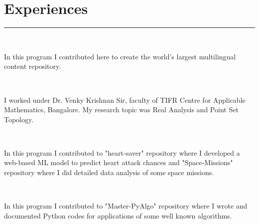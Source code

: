\documentclass[]{debjitpal-resume}
\begin{document}
\begin{minipage}[t]{0.6\textwidth}
\section{Experiences}
\noindent\rule{12.5cm}{0.4pt}
 \\
\noindent
\hspace{4em}%
\begin{minipage}{0.85\textwidth\vspace{2pt}}
In this program I contributed here to create the world's largest multilingual content repository.\\
\end{minipage}
\sectionsep
{} \\
\noindent
\hspace{4em}%
\begin{minipage}{0.85\textwidth\vspace{2pt}}
I worked under Dr. Venky Krishnan Sir, faculty of TIFR Centre for Applicable Mathematics, Bangalore. My research topic was Real Analysis and Point Set Topology.\\
\end{minipage}
\sectionsep
{} \\
\noindent
\hspace{4em}%
\begin{minipage}{0.85\textwidth\vspace{2pt}}
In this program I contributed to "heart‐saver" repository where I developed a web-based ML model to predict heart attack chances and "Space‐Missions" repository where I did detailed data analysis of some space missions.\\
\end{minipage}
\sectionsep
{} \\
\noindent
\hspace{4em}%
\begin{minipage}{0.85\textwidth\vspace{2pt}}
In this program I contributed to "Master-PyAlgo" repository where I wrote and documented Python codes for applications of some well known algorithms.\\
\end{minipage}

\end{minipage}
\end{document}
